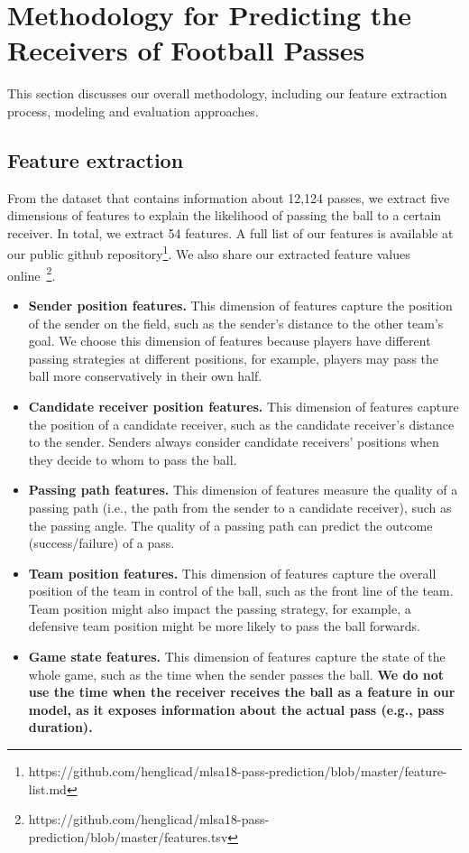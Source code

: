 \section{Methodology for Predicting the Receivers of Football Passes} \label{methodology}
This section discusses our overall methodology, including our feature extraction process, modeling and evaluation approaches.

\subsection{Feature extraction}

From the dataset that contains information about 12,124 passes\footnotemark[\ref{origin_dataset}], we extract five dimensions of features to explain the likelihood of passing the ball to a certain receiver. In total, we extract 54 features. A full list of our features is available at our public github repository\footnote{\label{feature-list}https://github.com/henglicad/mlsa18-pass-prediction/blob/master/feature-list.md}. 
We also share our extracted feature values online~\footnote{\label{feature-values}https://github.com/henglicad/mlsa18-pass-prediction/blob/master/features.tsv}.
\begin{itemize}
	\item \textbf{Sender position features.} This dimension of features capture the position of the sender on the field, such as the sender's distance to the other team's goal. We choose this dimension of features because players have different passing strategies at different positions, for example, players may pass the ball more conservatively in their own half. %
	\item \textbf{Candidate receiver position features.} This dimension of features capture the position of a candidate receiver, such as the candidate receiver's distance to the sender. Senders always consider candidate receivers' positions when they decide to whom to pass the ball.
	\item \textbf{Passing path features.} This dimension of features measure the quality of a passing path (i.e., the path from the sender to a candidate receiver), such as the passing angle. The quality of a passing path can predict the outcome (success/failure) of a pass.
	\item \textbf{Team position features.} This dimension of features capture the overall position of the team in control of the ball, such as the front line of the team. Team position might also impact the passing strategy, for example, a defensive team position might be more likely to pass the ball forwards.
	\item \textbf{Game state features.} This dimension of features capture the state of the whole game, such as the time when the sender passes the ball. \textbf{We do not use the time when the receiver receives the ball as a feature in our model, as it exposes information about the actual pass (e.g., pass duration).}
\end{itemize}

